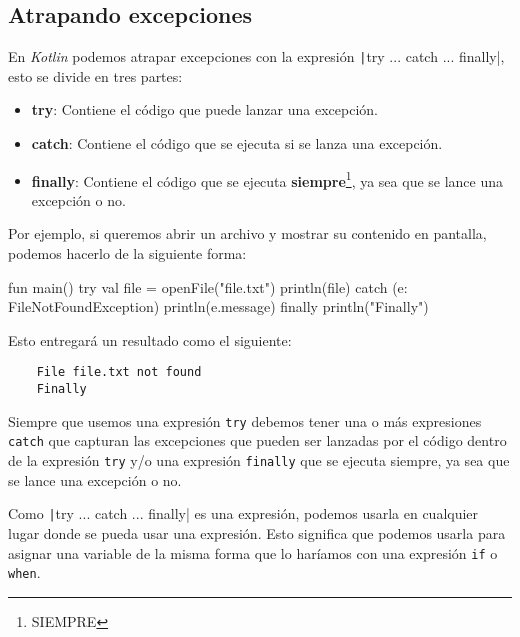 \subsection{Atrapando excepciones}
  \label{sec:atrapando-excepciones}

  En \textit{Kotlin} podemos atrapar excepciones con la expresión 
  \texttt|try ... catch ... finally|, esto se divide en tres partes:

  \begin{itemize}
    \item \textbf{try}: Contiene el código que puede lanzar una excepción.
    \item \textbf{catch}: Contiene el código que se ejecuta si se lanza una excepción.
    \item \textbf{finally}: Contiene el código que se ejecuta \textbf{siempre}\footnote{SIEMPRE}, ya 
      sea que se lance una excepción o no.
  \end{itemize}

  Por ejemplo, si queremos abrir un archivo y mostrar su contenido en pantalla, podemos hacerlo de 
  la siguiente forma:

  \begin{kotlin}
    fun main() {
      try {
        val file = openFile("file.txt")
        println(file)
      } catch (e: FileNotFoundException) {
        println(e.message)
      } finally {
        println("Finally")
      }
    }
  \end{kotlin}

  Esto entregará un resultado como el siguiente:

  \begin{verbatim}
    File file.txt not found
    Finally
  \end{verbatim}

  Siempre que usemos una expresión \texttt{try} debemos tener una o más expresiones
  \texttt{catch} que capturan las excepciones que pueden ser lanzadas por el código
  dentro de la expresión \texttt{try} y/o una expresión \texttt{finally}
  que se ejecuta siempre, ya sea que se lance una excepción o no.

  \begin{note}
    Como \texttt|try ... catch ... finally| es una expresión, podemos usarla en
    cualquier lugar donde se pueda usar una expresión.
    Esto significa que podemos usarla para asignar una variable de la misma forma que lo haríamos
    con una expresión \texttt{if} o \texttt{when}.
  \end{note}

  